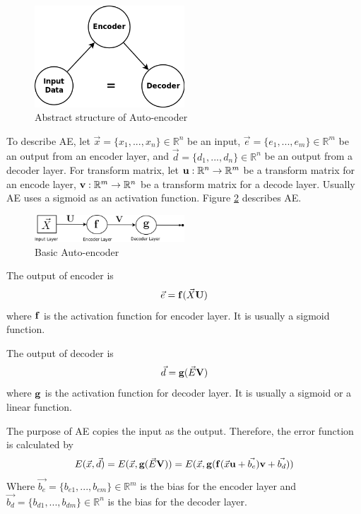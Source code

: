 \documentclass[draft,dvipsnames]{drexel-thesis}
\begin{document}
\begin{thesis}
\begin{figure}[t!]
    \centering
    \includegraphics[width=0.5\textwidth]{pictures/figures/AE.png}
    \caption{Abstract structure of Auto-encoder}
    \label{fig:AE}
\end{figure}

To describe AE, let $\vec{x} = \{x_1, ..., x_n\} \in \mathbb{R}^n$ be an input, $\vec{e} = \{e_1, ..., e_m\} \in \mathbb{R}^m$ be an output from an encoder layer, and $\vec{d} = \{d_1, ..., d_n\} \in \mathbb{R}^n$ be an output from a decoder layer. For transform matrix, let $\bold{u}: \mathbb{R}^n \rightarrow \mathbb{R}^m$ be a transform matrix for an encode layer, $\bold{v}: \mathbb{R}^m \rightarrow \mathbb{R}^n$ be a transform matrix for a decode layer. Usually AE uses a sigmoid as an activation function. Figure \ref{fig:basic_AE} describes AE.

\begin{figure}[t!]
    \centering
    \includegraphics[width=0.5\textwidth]{pictures/figures/basic_AE.png}
    \caption{Basic Auto-encoder}
    \label{fig:basic_AE}
\end{figure}

The output of encoder is
$$\vec{e} = \bold{f}(\vec{X}\bold{U})$$
where $\bold{f}$ is the activation function for encoder layer. It is usually a sigmoid function.

The output of decoder is
$$\vec{d} = \bold{g}(\vec{E}\bold{V})$$
where $\bold{g}$ is the activation function for decoder layer. It is usually a sigmoid or a linear function.

The purpose of AE copies the input as the output. Therefore, the error function is calculated by
$$E(\vec{x}, \vec{d}) = E(\vec{x}, \bold{g}(\vec{E}\bold{V})) = E(\vec{x}, \bold{g}(\bold{f}(\vec{x}\bold{u}+\vec{b_e})\bold{v}+\vec{b_d}))$$
Where $\vec{b_e} = \{b_{e1}, ..., b_{em}\} \in \mathbb{R}^m$ is the bias for the encoder layer and $\vec{b_d} = \{b_{d1}, ..., b_{dm}\} \in \mathbb{R}^n$ is the bias for the decoder layer.


\end{thesis}
\end{document}
